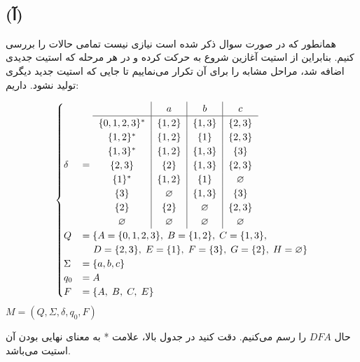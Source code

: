 \\[0.1in]
\subsection*{(آ)}
همانطور که در صورت سوال ذکر شده است نیازی نیست تمامی حالات را بررسی کنیم. بنابراین از 
 استیت آغازین شروع به حرکت کرده و در هر مرحله که استیت جدیدی اضافه شد، مراحل مشابه را برای آن تکرار می‌نماییم تا جایی که استیت جدید دیگری تولید نشود.
داریم:

\begin{center}
    \begin{equation*}
    \begin{cases}
        \delta &=
        \begin{tabular}{c|c|c|c}
         & $a$ & $b$ & $c$\\ \hline
        $\{0,1,2,3\}^*$ & $\{1,2\}$ &$\{1,3\}$ & $\{2,3\}$ \\
        $\{1,2\}^*$ & $\{1,2\}$ &$\{1\}$& $\{2,3\}$\\
        $\{1,3\}^*$ & $\{1,2\}$ &$\{1,3\}$& $\{3\}$\\
        $\{2,3\}$ & $\{2\}$ &$\{1,3\}$&$\{2,3\}$\\
        $\{1\}^*$ & $\{1,2\}$ &$\{1\}$&$\varnothing$ \\
        $\{3\}$ & $\varnothing$ &$\{1,3\}$&$\{3\}$ \\
        $\{2\}$ & $\{2\}$ &$\varnothing$&$\{2,3\}$ \\
        $\varnothing$ & $\varnothing$ &$\varnothing$&$\varnothing$ \\
        \end{tabular}\\[0.2in]
        Q &= \{ A=\{0,1,2,3\},\; B=\{1,2\},\;C=\{1,3\},\\
        &\;\;\;\; D=\{2,3\},\;
        E=\{1\},\; F=\{3\},\;G=\{2\},\;H=\varnothing\} \\
        \Sigma &= \{ a, b, c\} \\
        q_0 &= A\\
        F &= \{A,\;B,\;C,\;E\}\\
    \end{cases}
    \end{equation*}
    $M = (Q, \Sigma, \delta, q_0, F)$
    \\[0.3in]
\end{center}
حال $DFA$ را رسم می‌کنیم. دقت کنید در جدول بالا، علامت * به معنای نهایی بودن آن استیت می‌باشد.

